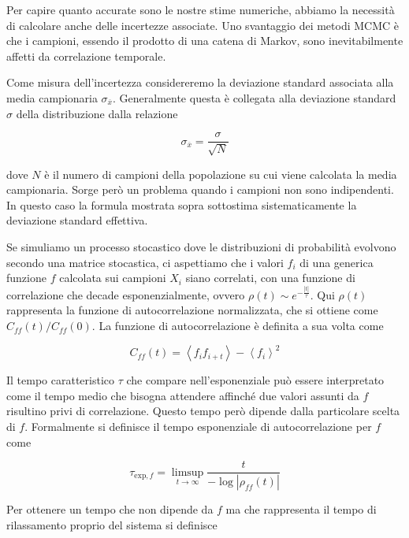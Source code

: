 \documentclass[11pt, a4paper]{article}
\begin{document}
Per capire quanto accurate sono le nostre stime numeriche, abbiamo la necessità di calcolare anche delle incertezze associate.
Uno svantaggio dei metodi MCMC è che i campioni, essendo il prodotto di una catena di Markov, sono inevitabilmente affetti da correlazione temporale.

Come misura dell'incertezza considereremo la deviazione standard associata alla media campionaria $\sigma_{\overline{x}}$.
Generalmente questa è collegata alla deviazione standard $\sigma$ della distribuzione dalla relazione

\begin{equation}
  \sigma_{\overline{x}} = \frac{\sigma}{\sqrt{N}}
\end{equation}

dove $N$ è il numero di campioni della popolazione su cui viene calcolata la media campionaria.
Sorge però un problema quando i campioni non sono indipendenti. In questo caso la formula mostrata sopra sottostima sistematicamente la deviazione standard effettiva.

Se simuliamo un processo stocastico dove le distribuzioni di probabilità evolvono secondo una matrice stocastica, ci aspettiamo che i valori $f_i$ di una generica funzione $f$ calcolata sui campioni $X_i$ siano correlati, con una funzione di correlazione
che decade esponenzialmente, ovvero $\rho(t) \sim e^{-\frac{|t|}{\tau}}$.
Qui $\rho(t)$ rappresenta la funzione di autocorrelazione normalizzata, che si ottiene come $C_{ff}(t) / C_{ff}(0)$. La funzione di autocorrelazione è definita a sua volta come

\begin{equation}
  C_{ff}(t) =  \left\langle f_i f_{i+t}\right\rangle - \left\langle f_i \right\rangle ^ 2
\end{equation}

Il tempo caratteristico $\tau$ che compare nell'esponenziale può essere interpretato come il tempo medio che bisogna attendere affinché due valori assunti da $f$ risultino privi di correlazione.
Questo tempo però dipende dalla particolare scelta di $f$. Formalmente si definisce il tempo esponenziale di autocorrelazione per $f$ come

\begin{equation}
  \tau_{\mathrm{exp},f} = \limsup_{t \to \infty} \frac{t}{-\log\left|\rho_{ff}(t)\right|}
\end{equation}

Per ottenere un tempo che non dipende da $f$ ma che rappresenta il tempo di rilassamento proprio del sistema si definisce
\end{document}
